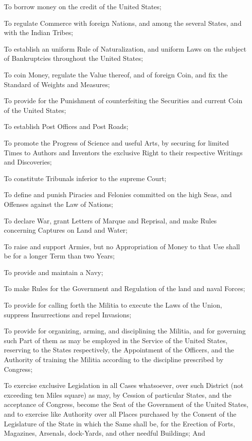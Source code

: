 \documentclass[12pt]{constitution}
\begin{document}
To borrow money on the credit of the United States;

To regulate Commerce with foreign Nations, and among the several States, and
with the Indian Tribes;

To establish an uniform Rule of Naturalization, and uniform Laws on the subject
of Bankruptcies throughout the United States;

To coin Money, regulate the Value thereof, and of foreign Coin, and fix the
Standard of Weights and Measures;

To provide for the Punishment of counterfeiting the Securities and current Coin
of the United States;

To establish Post Offices and Post Roads;

To promote the Progress of Science and useful Arts, by securing for limited
Times to Authors and Inventors the exclusive Right to their respective Writings
and Discoveries;

To constitute Tribunals inferior to the supreme Court;

To define and punish Piracies and Felonies committed on the high Seas, and
Offenses against the Law of Nations;

To declare War, grant Letters of Marque and Reprisal, and make Rules concerning
Captures on Land and Water;

To raise and support Armies, but no Appropriation of Money to that Use shall be
for a longer Term than two Years;

To provide and maintain a Navy;

To make Rules for the Government and Regulation of the land and naval Forces;

To provide for calling forth the Militia to execute the Laws of the Union,
suppress Insurrections and repel Invasions;

To provide for organizing, arming, and disciplining the Militia, and for
governing such Part of them as may be employed in the Service of the United
States, reserving to the States respectively, the Appointment of the Officers,
and the Authority of training the Militia according to the discipline
prescribed by Congress;

To exercise exclusive Legislation in all Cases whatsoever, over such District
(not exceeding ten Miles square) as may, by Cession of particular States, and
the acceptance of Congress, become the Seat of the Government of the United
States, and to exercise like Authority over all Places purchased by the Consent
of the Legislature of the State in which the Same shall be, for the Erection of
Forts, Magazines, Arsenals, dock-Yards, and other needful Buildings; And
\end{document}
